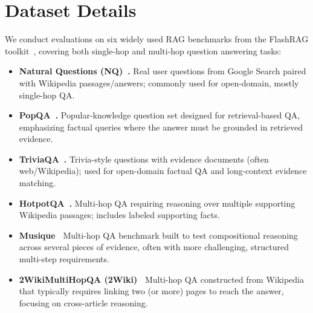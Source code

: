 \section{Dataset Details}
\label{app:dataset}
We conduct evaluations on six widely used RAG benchmarks from the FlashRAG toolkit~\cite{FlashRAG}, covering both single-hop and multi-hop question answering tasks:
\begin{itemize}
    \item \textbf{Natural Questions (NQ)~\cite{nq}.} Real user questions from Google Search paired with Wikipedia passages/answers; commonly used for open-domain, mostly single-hop QA.
    \item \textbf{PopQA~\cite{popqa}.} Popular-knowledge question set designed for retrieval-based QA, emphasizing factual queries where the answer must be grounded in retrieved evidence.
    \item \textbf{TriviaQA~\cite{triviaqa}.} Trivia-style questions with evidence documents (often web/Wikipedia); used for open-domain factual QA and long-context evidence matching.
    \item \textbf{HotpotQA~\cite{hotpotqa}.} Multi-hop QA requiring reasoning over multiple supporting Wikipedia passages; includes labeled supporting facts.
    \item \textbf{Musique~\cite{musique}} Multi-hop QA benchmark built to test compositional reasoning across several pieces of evidence, often with more challenging, structured multi-step requirements.
    \item \textbf{2WikiMultiHopQA (2Wiki)~\cite{2wiki}} Multi-hop QA constructed from Wikipedia that typically requires linking two (or more) pages to reach the answer, focusing on cross-article reasoning.
\end{itemize}
